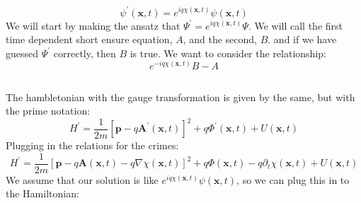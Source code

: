 \documentclass[12pt]{article}
\begin{document}
$$
\psi^{\prime}(\mathbf{x}, t)=e^{i q \chi(\mathbf{x}, t)} \psi(\mathbf{x}, t)
$$
We will start by making the ansatz that $\Psi^{\prime} = e^{i q \chi(\mathbf{x}, t)} \Psi$.
We will call the first time dependent short ensure equation, $A$, and the second, $B$.
and if we have guessed $\Psi^{\prime}$ correctly, then $B$ is true. 
We want to consider the relationship:
\begin{equation}
  e^{-i q \chi(\mathbf{x}, t)} B - A
\end{equation}

\subsection{}
The hambletonian with the gauge transformation is given by the same, but with the prime notation:
\begin{equation}
  H^{\prime}=\frac{1}{2 m}[\mathbf{p}-q \mathbf{A}^{\prime}(\mathbf{x}, t)]^{2}+q \Phi^{\prime}(\mathbf{x}, t)+U(\mathbf{x}, t)
\end{equation}
Plugging in the relations for the crimes:
\begin{equation}
  H^{\prime}=\frac{1}{2 m}[\mathbf{p}-q \mathbf{A}(\mathbf{x}, t) - q \nabla \chi(\mathbf{x}, t)]^{2}+q \Phi(\mathbf{x}, t) - q \partial_{t} \chi(\mathbf{x}, t) + U(\mathbf{x}, t)
\end{equation}
We assume that our solution is like $e^{i q \chi(\mathbf{x}, t)} \psi(\mathbf{x}, t)$, so we can plug this in to the Hamiltonian:
\end{document}
